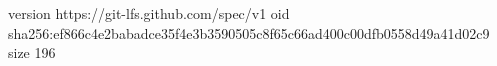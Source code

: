 version https://git-lfs.github.com/spec/v1
oid sha256:ef866c4e2babadce35f4e3b3590505c8f65c66ad400c00dfb0558d49a41d02c9
size 196
